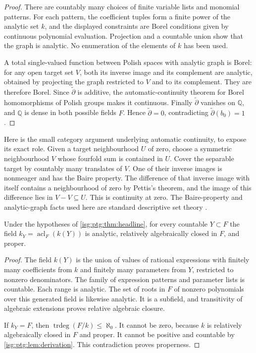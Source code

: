 \documentclass[11pt]{article}
\theoremstyle{definition}
\theoremstyle{remark}
\newcommand{\Q}{\mathbb{Q}}
\newcommand{\acl}{\operatorname{acl}}
\newcommand{\trdeg}{\operatorname{trdeg}}
\begin{document}
\begin{proof}
There are countably many choices of finite variable lists and monomial
patterns. For each pattern, the coefficient tuples form a finite power of
the analytic set $k$, and the displayed constraints are Borel conditions
given by continuous polynomial evaluation. Projection and a countable union
show that the graph is analytic. No enumeration of the elements of $k$ has
been used.

A total single-valued function between Polish spaces with analytic graph
is Borel: for any open target set $V$, both its inverse image and its
complement are analytic, obtained by projecting the graph restricted to $V$
and to its complement. They are therefore Borel. Since
$\widetilde\partial$ is additive, the automatic-continuity theorem for
Borel homomorphisms of Polish groups makes it continuous. Finally
$\widetilde\partial$ vanishes on $\Q$, and $\Q$ is dense in both possible
fields $F$. Hence $\widetilde\partial=0$, contradicting
$\widetilde\partial(b_0)=1$.
\end{proof}

Here is the small category argument underlying automatic continuity, to
expose its exact role. Given a target neighbourhood $U$ of zero, choose a
symmetric neighbourhood $V$ whose fourfold sum is contained in $U$. Cover
the separable target by countably many translates of $V$. One of their
inverse images is nonmeager and has the Baire property. The difference of
that inverse image with itself contains a neighbourhood of zero by
Pettis's theorem, and the image of this difference lies in $V-V\subseteq
U$. This is continuity at zero. The Baire-property and analytic-graph facts
used here are standard descriptive set theory \cite{Kechris}.

\begin{proposition}\label{isg:ptg:prop:hulls}
Under the hypotheses of \cref{isg:ptg:thm:headline}, for every countable
$Y\subset F$ the field $k_Y=\acl_F(k(Y))$ is analytic, relatively
algebraically closed in $F$, and proper.
\end{proposition}
\begin{proof}
The field $k(Y)$ is the union of values of rational expressions with
finitely many coefficients from $k$ and finitely many parameters from $Y$,
restricted to nonzero denominators. The family of expression patterns and
parameter lists is countable. Each range is analytic. The set of roots in
$F$ of nonzero polynomials over this generated field is likewise analytic.
It is a subfield, and transitivity of algebraic extensions proves relative
algebraic closure.

If $k_Y=F$, then $\trdeg(F/k)\leq\aleph_0$. It cannot be zero, because $k$
is relatively algebraically closed in $F$ and proper. It cannot be positive
and countable by \cref{isg:ptg:lem:derivation}. This contradiction proves
properness.
\end{proof}
\end{document}
